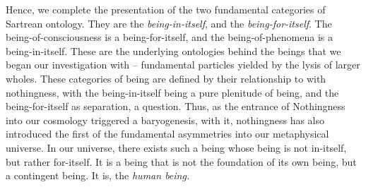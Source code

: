 
Hence, we complete the presentation of the two fundamental categories of Sartrean ontology. They are the \emph{being-in-itself}, and the \emph{being-for-itself}. The being-of-consciousness is a being-for-itself, and the being-of-phenomena is a being-in-itself. These are the underlying ontologies behind the beings that we began our investigation with -- fundamental particles yielded by the lysis of larger wholes. These categories of being are defined by their relationship to with nothingness, with the being-in-itself being a pure plenitude of being, and the being-for-itself as separation, a question. Thus, as the entrance of Nothingness into our cosmology triggered a baryogenesis, with it, nothingness has also introduced the first of the fundamental asymmetries into our metaphysical universe. In our universe, there exists such a being whose being is not in-itself, but rather for-itself. It is a being that is not the foundation of its own being, but a contingent being. It is, the \emph{human being.}




